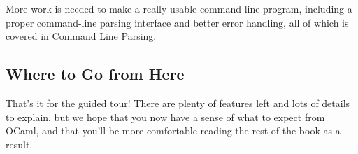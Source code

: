 More work is needed to make a really usable command-line program,
including a proper command-line parsing interface and better error
handling, all of which is covered in
\href{command-line-parsing.html\#command-line-parsing}{Command Line
Parsing}.

\hypertarget{where-to-go-from-here}{%
\subsection{Where to Go from Here}\label{where-to-go-from-here}}

That's it for the guided tour! There are plenty of features left and
lots of details to explain, but we hope that you now have a sense of
what to expect from OCaml, and that you'll be more comfortable reading
the rest of the book as a result.
